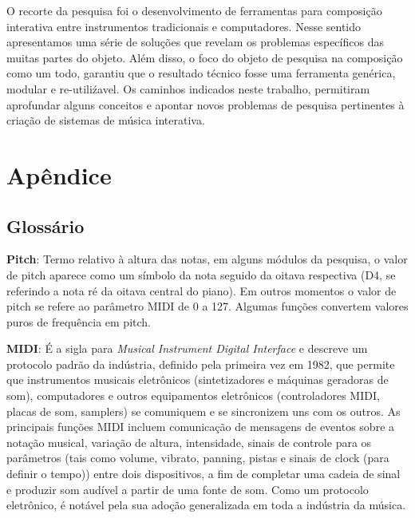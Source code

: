 \documentclass{ppgmus}
\begin{document}
O recorte da pesquisa foi o desenvolvimento de ferramentas para composição
interativa entre instrumentos tradicionais e computadores. 
Nesse sentido apresentamos uma série de soluções que revelam os problemas
específicos das muitas partes do objeto. Além disso, o foco do objeto
de pesquisa na composição como um todo, garantiu que o resultado técnico
fosse uma ferramenta genérica, modular e re-utiliźavel. 
Os caminhos indicados neste trabalho, permitiram aprofundar alguns conceitos e apontar
novos problemas de pesquisa pertinentes à criação de sistemas de música interativa.

 


\appendix
\chapter{Apêndice}
\label{chap:anexos}


\section{Glossário}
\label{glossario}


\textbf{Pitch}: Termo relativo à altura das notas, em alguns módulos da pesquisa,
o valor de pitch aparece como um símbolo da nota seguido da oitava respectiva (D4, se
referindo a nota ré da oitava central do piano). Em outros momentos o valor de pitch
se refere ao parâmetro MIDI de 0 a 127. Algumas funções convertem valores puros de frequência
em pitch.


\textbf{MIDI}: É a sigla para \textit{Musical Instrument Digital Interface} e descreve um protocolo padrão da indústria, 
definido pela primeira vez em 1982, que permite que instrumentos musicais eletrônicos 
(sintetizadores e máquinas geradoras de som), computadores e outros equipamentos eletrônicos (controladores MIDI, 
placas de som, samplers) se comuniquem e se sincronizem uns com os outros. 
As principais funções MIDI incluem comunicação de mensagens de eventos sobre a notação musical,  variação de altura, 
intensidade, sinais de controle para os parâmetros (tais como volume, vibrato, panning, pistas e sinais de 
clock (para definir o tempo)) entre dois dispositivos, a fim de completar uma cadeia de sinal e produzir som 
audível a partir de uma fonte de som. Como um protocolo eletrônico, é notável pela sua adoção generalizada em 
toda a indústria da música.
\end{document}
